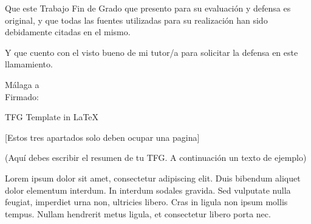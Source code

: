 \documentclass[12pt,a4paper]{report}
\numberwithin{figure}{section} %
\numberwithin{table}{section} %
\begin{document}
Que este Trabajo Fin de Grado que presento para su evaluación y defensa es original, y que todas las fuentes utilizadas para su realización han sido debidamente citadas en el mismo. 

\vspace{12pt}

Y que cuento con el visto bueno de mi tutor/a para solicitar la defensa en este llamamiento.
\begin{flushright}
    Málaga a  \makebox[2cm]{\dotfill} \\ %
    \vspace{5cm}
     Firmado: \makebox[5cm]{\dotfill} %
\end{flushright}



\newpage
{} %

\renewcommand{\contentsname}{ÍNDICE} 
\tableofcontents

\newpage 
{} %

\vspace{12pt}

\noindent TFG Template in \LaTeX %

\vspace{12pt}


\vspace{12pt}

[Estos tres apartados solo deben ocupar una pagina]

\vspace{12pt}

(Aquí debes escribir el resumen de tu TFG. A continuación un texto de ejemplo)

\vspace{12pt}

Lorem ipsum dolor sit amet, consectetur adipiscing elit. Duis bibendum aliquet dolor elementum interdum. In interdum sodales gravida. Sed vulputate nulla feugiat, imperdiet urna non, ultricies libero. Cras in ligula non ipsum mollis tempus. Nullam hendrerit metus ligula, et consectetur libero porta nec. 
\end{document}
